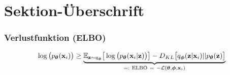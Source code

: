 

\author[Sebastian Hahn]{Nix}


\beamertemplatenavigationsymbolsempty{}



\section{Sektion-Überschrift}

\begin{frame}
	\frametitle{Verlustfunktion (ELBO)}
	\begin{align*}
	\log\big(p_{\boldsymbol\theta}(\x)\big)
	\geq\underbrace{ \E_{\z\sim q_{\boldsymbol\phi}}\big[\log\big(\pdec\big)\big] - D_{KL}\big[\qenc||p_{\boldsymbol\theta}(\z)\big]}_{=:\ \mathrm{ELBO}\ =\ -\mathcal{L}(\boldsymbol\theta,\boldsymbol\phi,\mathbf{x}_i)}
	\end{align*}
\end{frame}

